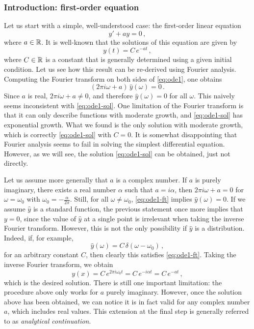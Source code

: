 \subsubsection{Introduction: first-order equation}
Let us start with a simple, well-understood case: the first-order linear equation
\begin{equation}
  y'+ay=0\,,\label{eq:ode1}
\end{equation}
where $a\in\mathbb{R}$. It is well-known that the solutions of this equation are given by
\begin{equation}
  y(t)=C\,e^{-at}\,,
  \label{eq:ode1-sol}
\end{equation}
where $C\in\mathbb{R}$ is a constant that is generally determined using a given initial condition.
Let us see how this result can be re-derived using Fourier analysis. Computing the Fourier
transform on both sides of \cref{eq:ode1}, one obtains
\begin{equation}
  (2\pi i\omega+a)\,\hat{y}(\omega)=0\,.
  \label{eq:ode1-ft}
\end{equation}
Since $a$ is real, $2\pi i\omega+a\neq 0$, and therefore $\hat{y}(\omega)=0$ for all
$\omega$. This naively seems inconsistent with \cref{eq:ode1-sol}. One limitation of the
Fourier transform is that it can only describe functions with moderate growth, and
\cref{eq:ode1-sol} has exponential growth. What we found is the only solution with
moderate growth, which is correctly \cref{eq:ode1-sol} with $C=0$. It is somewhat
disappointing that Fourier analysis seems to fail in solving the simplest differential
equation. However, as we will see, the solution \cref{eq:ode1-sol} can be obtained, just
not directly.

Let us assume more generally that $a$ is a complex number. If $a$ is purely imaginary,
\ie there exists a real number $\alpha$ such that $a=i\alpha$, then $2\pi i\omega+a=0$
for $\omega=\omega_0$ with $\omega_0=-\frac{\alpha}{2\pi}$. Still, for all
$\omega\neq\omega_0$, \cref{eq:ode1-ft} implies $\hat{y}(\omega)=0$. If we assume
$\hat{y}$ is a standard function, the previous statement once more implies that $y=0$,
since the value of $\hat{y}$ at a single point is irrelevant when taking the inverse
Fourier transform. However, this is not the only possibility if $\hat{y}$ is a
distribution. Indeed, if, for example,
\begin{equation}
  \hat{y}(\omega)=C\,\delta(\omega-\omega_0)\,,
  \label{eq:ode1-delta}
\end{equation}
for an arbitrary constant $C$, then clearly this satisfies \cref{eq:ode1-ft}. Taking the
inverse Fourier transform, we obtain
\begin{equation}
  y(x)=C\,e^{2\pi i\omega_0t}=C\,e^{-i\alpha t}=C\,e^{-at}\,,
\end{equation}
which is the desired solution. There is still one important limitation: the procedure
above only works for $a$ purely imaginary. However, once the solution above has been
obtained, we can notice it is in fact valid for any complex number $a$, which includes real
values. This extension at the final step is generally referred to as \emph{analytical
  continuation}.

